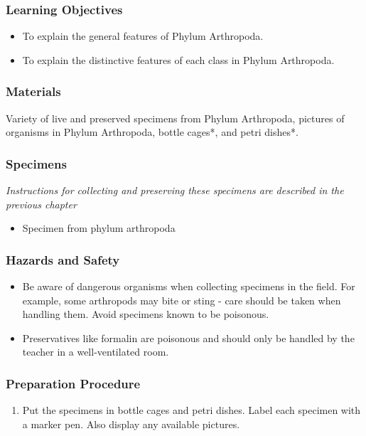 \subsubsection*{Learning Objectives}
\begin{itemize}
\item{To explain the general features of Phylum Arthropoda.}
\item{To explain the distinctive features of each class in Phylum Arthropoda.}
\end{itemize}

\subsubsection*{Materials}
Variety of live and preserved specimens from Phylum Arthropoda, pictures of organisms in Phylum Arthropoda, bottle cages*, and petri dishes*.

\subsubsection*{Specimens}
\textit{Instructions for collecting and preserving these specimens are described in the previous chapter}
\begin{itemize}
\item{Specimen from phylum arthropoda}
\end{itemize}

\subsubsection*{Hazards and Safety}
\begin{itemize}
\item{Be aware of dangerous organisms when collecting specimens in the field. For example, some arthropods may bite or sting - care should be taken when handling them. Avoid specimens known to be poisonous.}
\item{Preservatives like formalin are poisonous and should only be handled by the teacher in a well-ventilated room.}
\end{itemize}

\subsubsection*{Preparation Procedure}
\begin{enumerate}
\item{Put the specimens in bottle cages and petri dishes. Label each specimen with a marker pen. Also display any available pictures.}
\end{enumerate}

